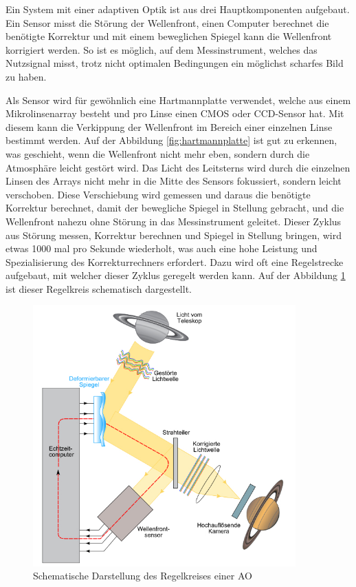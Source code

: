 \begin{refsection}
Ein System mit einer adaptiven Optik ist aus drei Hauptkomponenten
aufgebaut. Ein Sensor misst die Störung der Wellenfront, einen Computer
berechnet die benötigte Korrektur und mit einem beweglichen Spiegel
kann die Wellenfront korrigiert werden. So ist es möglich, auf dem
Messinstrument, welches das Nutzsignal misst, trotz nicht optimalen
Bedingungen ein möglichst scharfes Bild zu haben.

Als Sensor wird für gewöhnlich eine Hartmannplatte verwendet,
welche aus einem Mikrolinsenarray besteht und pro Linse einen CMOS
oder CCD-Sensor hat. Mit diesem kann  die Verkippung der Wellenfront
im Bereich einer einzelnen Linse bestimmt werden. Auf der Abbildung
\ref{fig:hartmannplatte} ist gut zu erkennen, was geschieht, wenn
%
%
die Wellenfront nicht mehr eben, sondern durch die Atmosphäre leicht
gestört wird. Das Licht des Leitsterns wird durch die einzelnen Linsen
des Arrays nicht mehr in die Mitte des Sensors fokussiert, sondern
leicht verschoben. Diese Verschiebung wird gemessen und daraus die
benötigte Korrektur berechnet, damit der bewegliche Spiegel in Stellung
gebracht, und die Wellenfront nahezu ohne Störung in das Messinstrument
geleitet. Dieser Zyklus aus Störung messen, Korrektur berechnen und
Spiegel in Stellung bringen, wird etwas 1000 mal pro Sekunde wiederholt,
was auch eine hohe Leistung und Spezialisierung des Korrekturrechners
erfordert. Dazu wird oft eine Regelstrecke aufgebaut, mit welcher dieser
Zyklus geregelt werden kann. Auf der Abbildung \ref{fig:schematischAO}
ist dieser Regelkreis schematisch dargestellt.

\begin{figure}
  \centering
  \includegraphics[width=0.9\textwidth]{adaptiv/images/schematichAO}
  \caption{Schematische Darstellung des Regelkreises einer AO
    \cite{robani:schematischAO}}
  \label{fig:schematischAO}
\end{figure}


\end{refsection}
